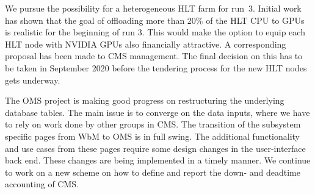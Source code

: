\documentclass[12pt]{article}
\begin{document}

We pursue the possibility for a heterogeneous HLT farm for run~3. Initial work has shown that the goal of offloading more than 20\% of the HLT CPU to GPUs is realistic for the beginning of run 3. This would make the option to equip each HLT node with NVIDIA GPUs also financially attractive. A corresponding proposal has been made to CMS management. The final decision on this has to be taken in September 2020 before the tendering process for the new HLT nodes gets underway.


The OMS project is making good progress on restructuring the underlying database tables. The main issue is to converge on the data inputs, where we have to rely on work done by other groups in CMS.
The transition of the subsystem specific pages from WbM to OMS is in full swing. The additional functionality and use cases from these pages require some design changes in the user-interface back end. These changes are being implemented in a timely manner.
We continue to work on a new scheme on how to define and report the down- and deadtime accounting of CMS.
\end{document}
